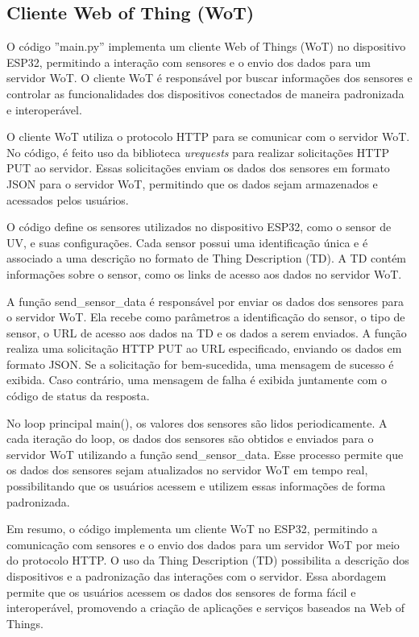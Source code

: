 \subsection{Cliente Web of Thing (WoT)}

O código ''main.py''  implementa um cliente Web of Things (WoT) no dispositivo ESP32, permitindo a interação com sensores e o envio dos dados para um servidor WoT. O cliente WoT é responsável por buscar informações dos sensores e controlar as funcionalidades dos dispositivos conectados de maneira padronizada e interoperável.

O cliente WoT utiliza o protocolo HTTP para se comunicar com o servidor WoT. No código, é feito uso da biblioteca \textit{urequests} para realizar solicitações HTTP PUT ao servidor. Essas solicitações enviam os dados dos sensores em formato JSON para o servidor WoT, permitindo que os dados sejam armazenados e acessados pelos usuários.

O código define os sensores utilizados no dispositivo ESP32, como o sensor de UV, e suas configurações. Cada sensor possui uma identificação única e é associado a uma descrição no formato de Thing Description (TD). A TD contém informações sobre o sensor, como os links de acesso aos dados no servidor WoT.

A função send_sensor_data é responsável por enviar os dados dos sensores para o servidor WoT. Ela recebe como parâmetros a identificação do sensor, o tipo de sensor, o URL de acesso aos dados na TD e os dados a serem enviados. A função realiza uma solicitação HTTP PUT ao URL especificado, enviando os dados em formato JSON. Se a solicitação for bem-sucedida, uma mensagem de sucesso é exibida. Caso contrário, uma mensagem de falha é exibida juntamente com o código de status da resposta.

No loop principal main(), os valores dos sensores são lidos periodicamente. A cada iteração do loop, os dados dos sensores são obtidos e enviados para o servidor WoT utilizando a função send_sensor_data. Esse processo permite que os dados dos sensores sejam atualizados no servidor WoT em tempo real, possibilitando que os usuários acessem e utilizem essas informações de forma padronizada.

Em resumo, o código implementa um cliente WoT no ESP32, permitindo a comunicação com sensores e o envio dos dados para um servidor WoT por meio do protocolo HTTP. O uso da Thing Description (TD) possibilita a descrição dos dispositivos e a padronização das interações com o servidor. Essa abordagem permite que os usuários acessem os dados dos sensores de forma fácil e interoperável, promovendo a criação de aplicações e serviços baseados na Web of Things.

